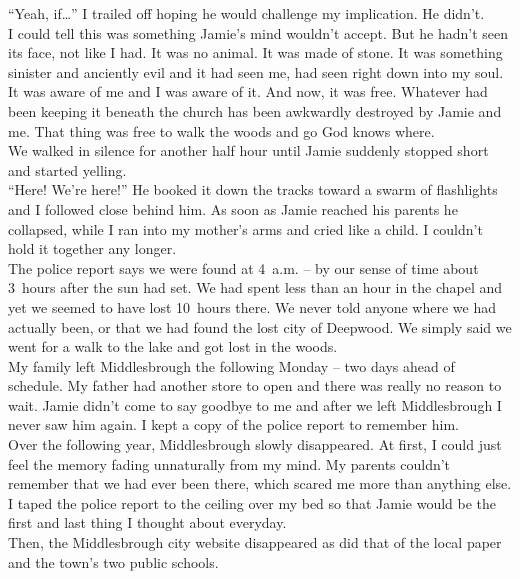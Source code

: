 \documentclass[a5paper]{scrartcl}
\begin{document}
\enquote{Yeah, if\dots} I trailed off hoping he would challenge my implication. He didn't.\\


I could tell this was something Jamie's mind wouldn't accept. But he hadn't seen its face, not like I had. It was no animal. It was made of stone. It was something sinister and anciently evil and it had seen me, had seen right down into my soul. It was aware of me and I was aware of it. And now, it was free. Whatever had been keeping it beneath the church has been awkwardly destroyed by Jamie and me. That thing was free to walk the woods and go God knows where. \\


We walked in silence for another half hour until Jamie suddenly stopped short and started yelling.\\


\enquote{Here! We're here!} He booked it down the tracks toward a swarm of flashlights and I followed close behind him. As soon as Jamie reached his parents he collapsed, while I ran into my mother's arms and cried like a child. I couldn't hold it together any longer.\\


The police report says we were found at 4~a.m. – by our sense of time about 3~hours after the sun had set. We had spent less than an hour in the chapel and yet we seemed to have lost 10~hours there. We never told anyone where we had actually been, or that we had found the lost city of Deepwood. We simply said we went for a walk to the lake and got lost in the woods. \\


My family left Middlesbrough the following Monday – two days ahead of schedule. My father had another store to open and there was really no reason to wait. Jamie didn't come to say goodbye to me and after we left Middlesbrough I never saw him again. I kept a copy of the police report to remember him.\\


Over the following year, Middlesbrough slowly disappeared. At first, I could just feel the memory fading unnaturally from my mind. My parents couldn't remember that we had ever been there, which scared me more than anything else. I taped the police report to the ceiling over my bed so that Jamie would be the first and last thing I thought about everyday.  \\


Then, the Middlesbrough city website disappeared as did that of the local paper and the town's two public schools.\\
\end{document}
